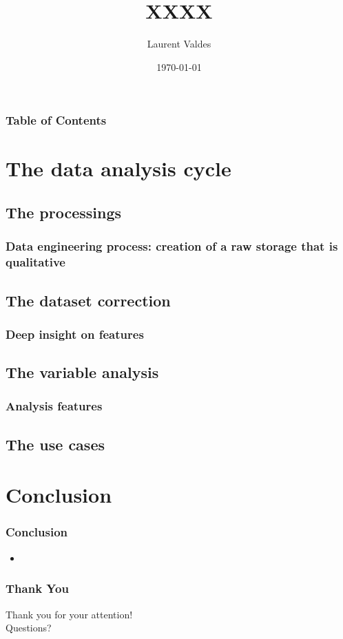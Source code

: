 \documentclass{beamer}
\title{XXXX}
\author{Laurent Valdes}
\institute{OpenClassRooms}
\date{\today}
\begin{document}
\begin{frame}
  \titlepage
\end{frame}

\begin{frame}
  \frametitle{Table of Contents}
  \tableofcontents
\end{frame}

\section{The data analysis cycle}
\subsection{The processings}
\begin{frame}
  \frametitle{Data engineering process: creation of a raw storage that is qualitative}
\end{frame}

\subsection{The dataset correction}
\begin{frame}
  \frametitle{Deep insight on features}
\end{frame}

\subsection{The variable analysis}
\begin{frame}
  \frametitle{Analysis features}

\end{frame}

\subsection{The use cases}
\begin{frame}
  \begin{itemize}
  \end{itemize}
\end{frame}


\section{Conclusion}

\begin{frame}
  \frametitle{Conclusion}
  \begin{itemize}
    \item
  \end{itemize}
\end{frame}

\begin{frame}
  \frametitle{Thank You}
  \centering Thank you for your attention!\\
  Questions?
\end{frame}
\end{document}
